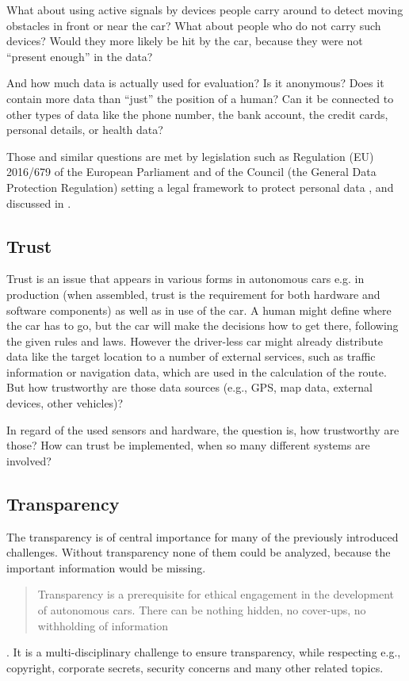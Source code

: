 What about using active signals by devices people carry around to detect moving obstacles in front or near the car? What about people who do not carry such devices? Would they more likely be hit by the  car, because they were not \enquote{present enough} in the data?

And how much data is actually used for evaluation? Is it anonymous? Does it contain more data than \enquote{just} the position of a human? Can it be connected to other types of data like the phone number, the bank account, the credit cards, personal details, or health data?

Those and similar questions are met by legislation such as Regulation (EU) 2016/679 of the European Parliament and of the Council (the General Data Protection Regulation) setting a legal framework to protect personal data \cite{EuropeanUnion2016}, and discussed in \cite{doi:10.1093/idpl/ipx005}.


\subsection{Trust}
\label{sec:EAofTC:Trust}

Trust is an issue that appears in various forms in autonomous cars e.g. in production (when assembled, trust is the requirement for both hardware and software components) as well as in use of the car. A human might define where the car has to go, but the  car will make the decisions how to get there, following the given rules and laws. However the driver-less car might already distribute data like the target location to a number of external services, such as traffic information or navigation data, which are used in the calculation of the route. But how trustworthy are those data sources (e.g., GPS, map data, external devices, other vehicles)? 

In regard of the used sensors and hardware, the question is, how trustworthy are those? How can trust be implemented, when so many different systems are involved? 


\subsection{Transparency}
\label{sec:EAofTC:Transparency}

The transparency is of central importance for many of the previously introduced challenges. Without transparency none of them could be analyzed, because the important information would be missing. \blockquote{Transparency is a prerequisite for ethical engagement in the development of autonomous cars. There can be nothing hidden, no cover-ups, no withholding of information} \cite{McBride:2016:EDC:2874239.2874265}. It is a multi-disciplinary challenge to ensure transparency, while respecting e.g., copyright, corporate secrets, security concerns and many other related topics. 

